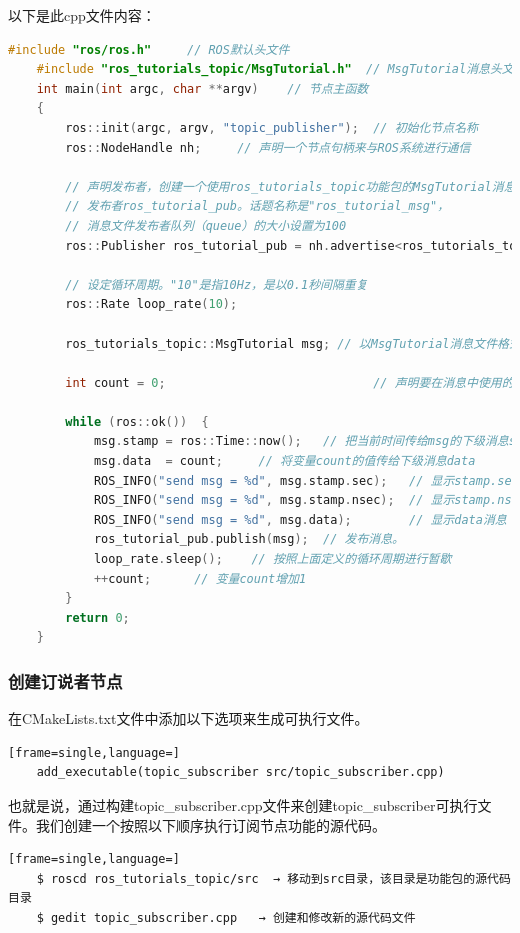 \documentclass[geye,green,kindle,cn]{elegantnote}
\begin{document}
以下是此cpp文件内容：
\begin{lstlisting}[frame=single,language=C++]
    #include "ros/ros.h"     // ROS默认头文件 
    #include "ros_tutorials_topic/MsgTutorial.h"  // MsgTutorial消息头文件（构建后自动生成） 
    int main(int argc, char **argv)    // 节点主函数 
    {  
        ros::init(argc, argv, "topic_publisher");  // 初始化节点名称  
        ros::NodeHandle nh;     // 声明一个节点句柄来与ROS系统进行通信  
        
        // 声明发布者，创建一个使用ros_tutorials_topic功能包的MsgTutorial消息文件的  
        // 发布者ros_tutorial_pub。话题名称是"ros_tutorial_msg"，  
        // 消息文件发布者队列（queue）的大小设置为100      
        ros::Publisher ros_tutorial_pub = nh.advertise<ros_tutorials_topic::MsgTutorial>("ros_tutorial_msg", 100); 
        
        // 设定循环周期。"10"是指10Hz，是以0.1秒间隔重复  
        ros::Rate loop_rate(10);  
        
        ros_tutorials_topic::MsgTutorial msg; // 以MsgTutorial消息文件格式声明一个叫做msg的消息  
        
        int count = 0;                             // 声明要在消息中使用的变量  
        
        while (ros::ok())  {    
            msg.stamp = ros::Time::now();   // 把当前时间传给msg的下级消息stamp     
            msg.data  = count;     // 将变量count的值传给下级消息data
            ROS_INFO("send msg = %d", msg.stamp.sec);   // 显示stamp.sec消息    
            ROS_INFO("send msg = %d", msg.stamp.nsec);  // 显示stamp.nsec消息    
            ROS_INFO("send msg = %d", msg.data);        // 显示data消息    
            ros_tutorial_pub.publish(msg);  // 发布消息。    
            loop_rate.sleep();    // 按照上面定义的循环周期进行暂歇    
            ++count;      // 变量count增加1  
        }  
        return 0; 
    }
\end{lstlisting}
\subsubsection{创建订说者节点}
在CMakeLists.txt文件中添加以下选项来生成可执行文件。
\begin{lstlisting}[frame=single,language=]
    add_executable(topic_subscriber src/topic_subscriber.cpp) 
\end{lstlisting}

也就是说，通过构建topic\_subscriber.cpp文件来创建topic\_subscriber可执行文件。我们创建一个按照以下顺序执行订阅节点功能的源代码。
\begin{lstlisting}[frame=single,language=]
    $ roscd ros_tutorials_topic/src  → 移动到src目录，该目录是功能包的源代码目录 
    $ gedit topic_subscriber.cpp   → 创建和修改新的源代码文件
\end{lstlisting}
\end{document}
